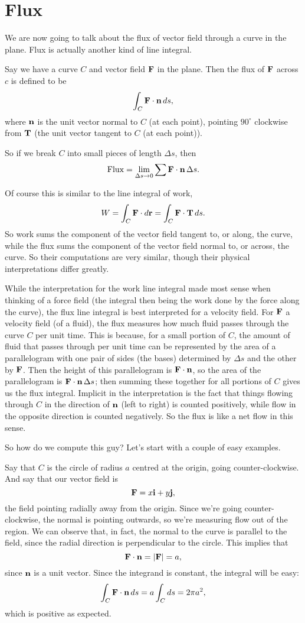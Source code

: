 \section{Flux}

We are now going to talk about the flux of vector field through a curve in the plane. Flux is actually another kind of line integral. 

\bdf 
Say we have a curve $C$ and vector field $\boldsymbol{\mathbf{F}}$ in the plane. Then the flux of $\boldsymbol{\mathbf{F}}$ across $c$ is defined to be 
\[ \int_C \boldsymbol{\mathbf{F}} \cdot \boldsymbol{\mathbf{n}}\, ds, \]
where $\boldsymbol{\mathbf{n}}$ is the unit vector normal to $C$ (at each point), pointing $90^\circ$ clockwise from $\boldsymbol{\mathbf{T}}$ (the unit vector tangent to $C$ (at each point)). 
\edf

So if we break $C$ into small pieces of length $\Delta s$, then 
\[ \mathrm{Flux} = \lim_{\Delta s \to 0} \sum \boldsymbol{\mathbf{F}} \cdot \boldsymbol{\mathbf{n}}\, \Delta s. \]

Of course this is similar to the line integral of work,
\[ W = \int_C \boldsymbol{\mathbf{F}} \cdot d\boldsymbol{\mathbf{r}} = \int_C \boldsymbol{\mathbf{F}} \cdot \boldsymbol{\mathbf{T}}\, ds. \]
So work sums the component of the vector field tangent to, or along, the curve, while the flux sums the component of the vector field normal to, or across, the curve. So their computations are very similar, though their physical interpretations differ greatly. 

While the interpretation for the work line integral made most sense when thinking of a force field (the integral then being the work done by the force along the curve), the flux line integral is best interpreted for a velocity field. For $\boldsymbol{\mathbf{F}}$ a velocity field (of a fluid), the flux measures how much fluid passes through the curve $C$ per unit time. This is because, for a small portion of $C$, the amount of fluid that passes through per unit time can be represented by the area of a parallelogram with one pair of sides (the bases) determined by $\Delta s$ and the other by $\boldsymbol{\mathbf{F}}$. Then the height of this parallelogram is $\boldsymbol{\mathbf{F}} \cdot \boldsymbol{\mathbf{n}}$, so the area of the parallelogram is $\boldsymbol{\mathbf{F}} \cdot \boldsymbol{\mathbf{n}} \, \Delta s$; then summing these together for all portions of $C$ gives us the flux integral. 
\brm
Implicit in the interpretation is the fact that things flowing through $C$ in the direction of $\boldsymbol{\mathbf{n}}$ (left to right) is counted positively, while flow in the opposite direction is counted negatively. So the flux is like a net flow in this sense.
\erm

So how do we compute this guy? Let's start with a couple of easy examples.

\bex
Say that $C$ is the circle of radius $a$ centred at the origin, going counter-clockwise. And say that our vector field is 
\[ \boldsymbol{\mathbf{F}} = x\boldsymbol{\mathbf{i}} + y\boldsymbol{\mathbf{j}}, \]
the field pointing radially away from the origin. Since we're going counter-clockwise, the normal is pointing outwards, so we're measuring flow out of the region. We can observe that, in fact, the normal to the curve is parallel to the field, since the radial direction is perpendicular to the circle. This implies that
\[ \boldsymbol{\mathbf{F}} \cdot \boldsymbol{\mathbf{n}} = |\boldsymbol{\mathbf{F}}| = a, \]
since $\boldsymbol{\mathbf{n}}$ is a unit vector. Since the integrand is constant, the integral will be easy:
\[ \int_C \boldsymbol{\mathbf{F}} \cdot \boldsymbol{\mathbf{n}} \, ds = a\int_C ds = 2\pi a^2, \]
which is positive as expected. 

